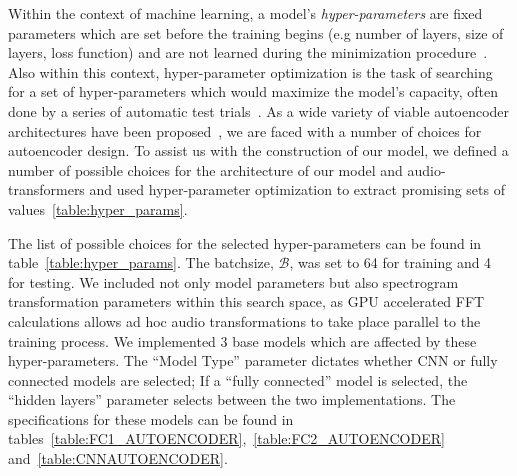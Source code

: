 \documentclass[\main/thesis.tex]{subfiles}
\begin{document}
Within the context of machine learning, a model's \emph{hyper-parameters} are fixed parameters which are set before the training begins (e.g number of layers, size of layers, loss function) and are not learned during the minimization procedure~\cite{bengio2000gradient}. Also within this context, hyper-parameter optimization is the task of searching for a set of hyper-parameters which would maximize the model's capacity, often done by a series of automatic test trials~\cite{bengio2000gradient,bergstra2011algorithms,bergstra2012random}. As a wide variety of viable autoencoder architectures have been proposed~\cite{aouameur2019neural,esling2018generative,gensler2016deep,zhang2016facing,pu2016variational}, we are faced with a number of choices for autoencoder design. To assist us with the construction of our model, we defined a number of possible choices for the architecture of our model and audio-transformers and used hyper-parameter optimization to extract promising sets of values~\ref{table:hyper_params}. 

The list of possible choices for the selected hyper-parameters can be found in table~\ref{table:hyper_params}. The batchsize, $\mathcal{B}$, was set to 64 for training and 4 for testing. We included not only model parameters but also spectrogram transformation parameters within this search space, as GPU accelerated FFT calculations allows ad hoc audio transformations to take place parallel to the training process. We implemented 3 base models which are affected by these hyper-parameters. The \enquote{Model Type} parameter dictates whether CNN or fully connected models are selected; If a \enquote{fully connected} model is selected, the \enquote{hidden layers} parameter selects between the two implementations. The specifications for these models can be found in tables~\ref{table:FC1_AUTOENCODER},~\ref{table:FC2_AUTOENCODER} and~\ref{table:CNNAUTOENCODER}.
\end{document}

